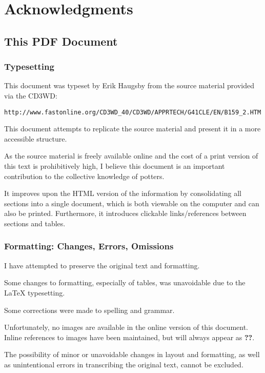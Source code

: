 \chapter*{Acknowledgments}
\section*{This PDF Document}
\subsection*{Typesetting}
This document was typeset by Erik Haugsby from the source material provided 
via the CD3WD:
\begin{verbatim}
http://www.fastonline.org/CD3WD_40/CD3WD/APPRTECH/G41CLE/EN/B159_2.HTM
\end{verbatim}
This document attempts to replicate the source material and present it in a 
more accessible structure.

As the source material is freely available online and the cost of a print 
version of this text is prohibitively high, I believe this document is an 
important contribution to the collective knowledge of potters. 

It improves upon the HTML version of the information by consolidating all 
sections into a single document, which is both viewable on the computer and can 
also be printed. Furthermore, it introduces clickable links/references between 
sections and tables.
\subsection*{Formatting: Changes, Errors, Omissions}
I have attempted to preserve the original text and formatting. 

Some changes to formatting, especially of tables, was unavoidable due to the 
LaTeX typesetting.

Some corrections were made to spelling and grammar.

Unfortunately, no images are available in the online version of this document. 
Inline references to images have been maintained, but will always appear as 
\textbf{??}.

The possibility of minor or unavoidable changes in layout and formatting, as 
well as unintentional errors in transcribing the original text, cannot be 
excluded.


